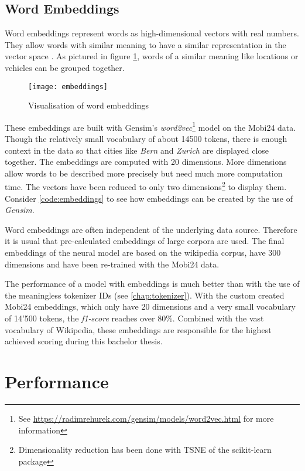 \subsection{Word Embeddings}
\label{chap:embd}

Word embeddings represent words as high-dimensional vectors with real numbers. They allow words with similar meaning to have a similar representation in the vector space \cite{emb18}. As pictured in figure \ref{fig:embeddings}, words of a similar meaning like locations or vehicles can be grouped together.

\begin{figure}[!ht]
    \centering
    \texttt{[image: embeddings]}
    \caption{Visualisation of word embeddings}
    \label{fig:embeddings}
\end{figure}

These embeddings are built with Gensim's \emph{word2vec}\footnote{See \url{https://radimrehurek.com/gensim/models/word2vec.html} for more information} model on the Mobi24 data. Though the relatively small vocabulary of about 14500 tokens, there is enough context in the data so that cities like \emph{Bern} and \emph{Zurich} are displayed close together. The embeddings are computed with 20 dimensions. More dimensions allow words to be described more precisely but need much more computation time. The vectors have been reduced to only two dimensions\footnote{Dimensionality reduction has been done with TSNE of the scikit-learn package} to display them. Consider \ref{code:embeddings} to see how embeddings can be created by the use of \emph{Gensim}.

Word embeddings are often independent of the underlying data source. Therefore it is usual that pre-calculated embeddings of large corpora are used. The final embeddings of the neural model are based on the wikipedia corpus, have 300 dimensions and have been re-trained with the Mobi24 data.

The performance of a model with embeddings is much better than with the use of the meaningless tokenizer IDs (see \ref{chap:tokenizer}). With the custom created Mobi24 embeddings, which only have 20 dimensions and a very small vocabulary of 14'500 tokens, the \emph{f1-score} reaches over 80\%. Combined with the vast vocabulary of Wikipedia, these embeddings are responsible for the highest achieved scoring during this bachelor thesis.

\section{Performance}
\label{chap:deep-performance}

